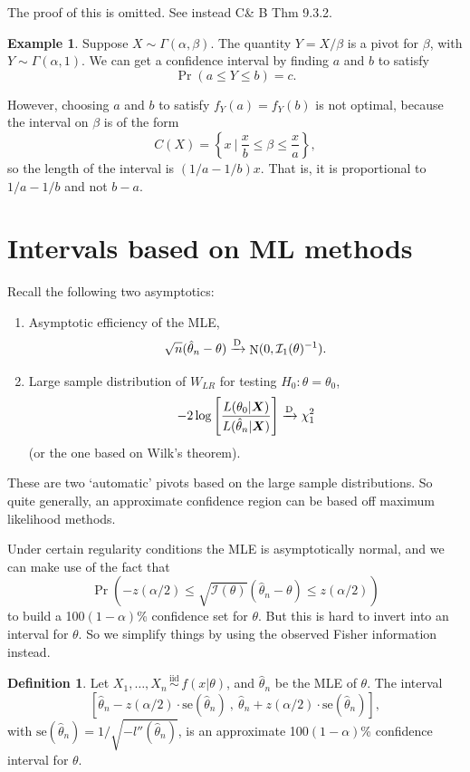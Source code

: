 \documentclass[
]{book}
\newcommand{\bX}{{\boldsymbol X}}
\DeclareMathOperator{\N}{N}
\newcommand{\iid}{\,\overset{\text{iid}}{\sim}\,}
\newcommand{\cI}{{\mathcal I}}
\theoremstyle{definition}
\newtheorem{definition}{Definition}[chapter]
\theoremstyle{definition}
\newtheorem{example}{Example}[chapter]
\theoremstyle{definition}
\theoremstyle{definition}
\theoremstyle{remark}
\begin{document}
The proof of this is omitted. See instead C\& B Thm 9.3.2.

\begin{example}
Suppose \(X\sim\Gamma(\alpha,\beta)\). The quantity \(Y=X/\beta\) is a pivot for \(\beta\), with \(Y\sim\Gamma(\alpha,1)\).
We can get a confidence interval by finding \(a\) and \(b\) to satisfy
\[
\Pr(a \leq Y \leq b) = c.
\]

However, choosing \(a\) and \(b\) to satisfy \(f_Y(a)=f_Y(b)\) is not optimal, because the interval on \(\beta\) is of the form
\[
C(X) = \left\{ x \ \bigg| \ \frac{x}{b} \leq \beta \leq \frac{x}{a}  \right\},
\]
so the length of the interval is \((1/a-1/b)x\). That is, it is proportional to \(1/a-1/b\) and not \(b-a\).
\end{example}

\hypertarget{intervals-based-on-ml-methods}{%
\section{Intervals based on ML methods}\label{intervals-based-on-ml-methods}}

Recall the following two asymptotics:

\begin{enumerate}
\def\labelenumi{\arabic{enumi}.}
\item
  Asymptotic efficiency of the MLE,
  \[\sqrt n (\hat\theta_n - \theta) \xrightarrow{\text D} \N(0,\cI_1(\theta)^{-1}).\]
\item
  Large sample distribution of \(W_{LR}\) for testing \(H_0:\theta=\theta_0\),
  \[
  -2\log \left[ \frac{L(\theta_0|\bX)}{L(\hat\theta_n|\bX)} \right]  \xrightarrow{\text D}  \chi^2_1
  \]
  (or the one based on Wilk's theorem).
\end{enumerate}

These are two `automatic' pivots based on the large sample distributions. So quite generally, an approximate confidence region can be based off maximum likelihood methods.

Under certain regularity conditions the MLE is asymptotically normal, and we can make use of the fact that
\[
\Pr\left(-z(\alpha/2) \leq \sqrt{\cI(\theta)} (\hat\theta_n - \theta) \leq z(\alpha/2) \right)
\]
to build a 100\((1-\alpha)\)\% confidence set for \(\theta\). But this is hard to invert into an interval for \(\theta\). So we simplify things by using the observed Fisher information instead.

\begin{definition}
Let \(X_1,\dots,X_n\iid f(x|\theta)\), and \(\hat\theta_n\) be the MLE of \(\theta\).
The interval
\[
\left[\hat\theta_n - z(\alpha/2)\cdot \text{se}(\hat\theta_n) \ , \  \hat\theta_n + z(\alpha/2)\cdot \text{se}(\hat\theta_n) \right],
\]
with \(\text{se}(\hat\theta_n) = 1 / \sqrt{-l''(\hat\theta_n)}\), is an approximate 100\((1-\alpha)\)\% confidence interval for \(\theta\).
\end{definition}
\end{document}
